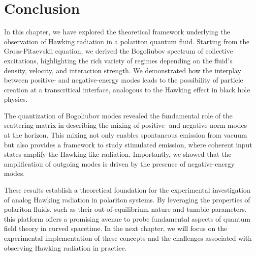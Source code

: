 \section{Conclusion}

In this chapter, we have explored the theoretical framework underlying the observation of Hawking radiation in a polariton quantum fluid. Starting from the Gross-Pitaevskii equation, we derived the Bogoliubov spectrum of collective excitations, highlighting the rich variety of regimes depending on the fluid's density, velocity, and interaction strength. We demonstrated how the interplay between positive- and negative-energy modes leads to the possibility of particle creation at a transcritical interface, analogous to the Hawking effect in black hole physics.

The quantization of Bogoliubov modes revealed the fundamental role of the scattering matrix in describing the mixing of positive- and negative-norm modes at the horizon. This mixing not only enables spontaneous emission from vacuum but also provides a framework to study stimulated emission, where coherent input states amplify the Hawking-like radiation. Importantly, we showed that the amplification of outgoing modes is driven by the presence of negative-energy modes.

These results establish a theoretical foundation for the experimental investigation of analog Hawking radiation in polariton systems. By leveraging the properties of polariton fluids, such as their out-of-equilibrium nature and tunable parameters, this platform offers a promising avenue to probe fundamental aspects of quantum field theory in curved spacetime. In the next chapter, we will focus on the experimental implementation of these concepts and the challenges associated with observing Hawking radiation in practice.